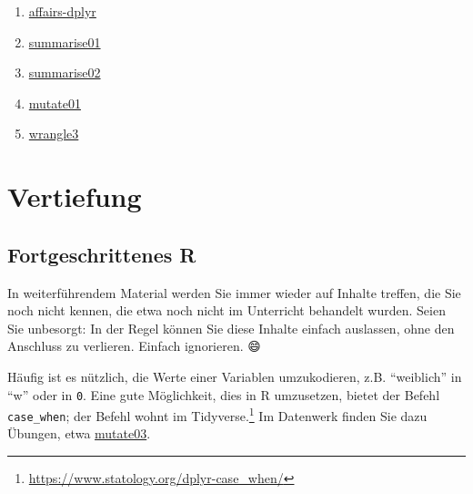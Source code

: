 \documentclass[
  letterpaper,
  oneside,
  open=any]{scrbook}
\theoremstyle{definition}
\theoremstyle{definition}
\theoremstyle{definition}
\theoremstyle{remark}
\begin{document}
\begin{enumerate}
\item
  \href{https://sebastiansauer.github.io/Datenwerk/posts/affairs-dplyr/affairs-dplyr.html}{affairs-dplyr}
\item
  \href{https://sebastiansauer.github.io/Datenwerk/posts/summarise01/summarise01.html}{summarise01}
\item
  \href{https://sebastiansauer.github.io/Datenwerk/posts/summarise02/summarise02.html}{summarise02}
\item
  \href{https://sebastiansauer.github.io/Datenwerk/posts/mutate01/mutate01.html}{mutate01}
\item
  \href{https://sebastiansauer.github.io/Datenwerk/posts/wrangle3/wrangle3}{wrangle3}
\end{enumerate}

\section{Vertiefung}\label{vertiefung-3}

\subsection{Fortgeschrittenes R}\label{fortgeschrittenes-r}

\begin{tcolorbox}[enhanced jigsaw, bottomrule=.15mm, left=2mm, colbacktitle=quarto-callout-note-color!10!white, bottomtitle=1mm, colframe=quarto-callout-note-color-frame, coltitle=black, rightrule=.15mm, breakable, toptitle=1mm, titlerule=0mm, title=\textcolor{quarto-callout-note-color}{\faInfo}\hspace{0.5em}{Hinweis}, opacitybacktitle=0.6, arc=.35mm, colback=white, leftrule=.75mm, opacityback=0, toprule=.15mm]

In weiterführendem Material werden Sie immer wieder auf Inhalte treffen,
die Sie noch nicht kennen, die etwa noch nicht im Unterricht behandelt
wurden. Seien Sie unbesorgt: In der Regel können Sie diese Inhalte
einfach auslassen, ohne den Anschluss zu verlieren. Einfach ignorieren.
😄

\end{tcolorbox}

Häufig ist es nützlich, die Werte einer Variablen umzukodieren, z.B.
\enquote{weiblich} in \enquote{w} oder in \texttt{0}. Eine gute
Möglichkeit, dies in R umzusetzen, bietet der Befehl
\texttt{case\_when}; der Befehl wohnt im Tidyverse.\footnote{\url{https://www.statology.org/dplyr-case_when/}}
Im Datenwerk finden Sie dazu Übungen, etwa
\href{https://sebastiansauer.github.io/Datenwerk/posts/mutate03/mutate03.html}{mutate03}.
\end{document}
